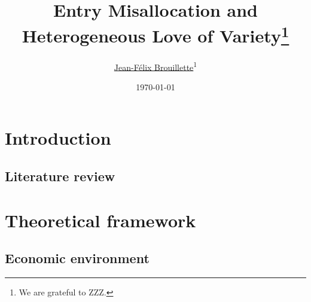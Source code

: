 \documentclass[12pt]{article}
\title{\textbf{Entry Misallocation and \\Heterogeneous Love of Variety}\thanks{We are grateful to ZZZ.}}
\author{\href{https://www.jeanfelixbrouillette.com}{Jean-F\'elix Brouillette}\textsuperscript{1}}
\date{\today}
\begin{document}
\maketitle


\begin{abstract}
    \lipsum[1]
\end{abstract}

\clearpage

\section{Introduction}
\label{s:introduction}

\subsection*{Literature review}
\label{s:literature review}

\section{Theoretical framework}
\label{s:theoretical framework}

\subsection{Economic environment}
\label{section:economic environment}
\end{document}
